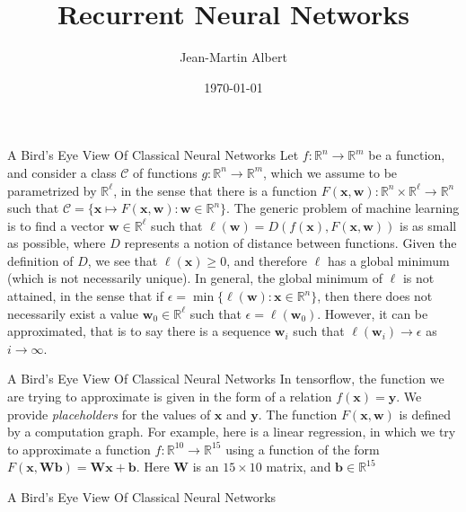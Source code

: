 \documentclass[10pt]{beamer}
\newcommand{\R}{\mathbb{R}}
\newcommand{\C}{\mathcal{C}}
\newcommand{\w}{\mathbf{w}}
\newcommand{\x}{\mathbf{x}}
\newcommand{\y}{\mathbf{y}}
\renewcommand{\b}{\mathbf{b}}
\newcommand{\W}{\mathbf{W}}
\begin{document}
\title{Recurrent Neural Networks}
\author{Jean-Martin Albert}
\date{\today}
\maketitle





\begin{frame}{A Bird's Eye View Of Classical Neural Networks}
Let $f:\R^n\to \R^m$ be a function, and consider a class $\C$ of functions $g: \R^n\to \R^m$, which we assume to be parametrized by $\R^\ell$, in the sense that there is a function $F(\x,\w):\R^n\times \R^\ell\to\R^n$ such that $\C=\{\x\mapsto F(\x,\w):\w\in\R^n\}$.  The generic problem of machine learning is to find a vector $\w\in\R^{\ell}$ such that $\ell(\w) = D(f(\x), F(\x, \w))$ is as small as possible, where $D$ represents a notion of distance between functions.
 Given the definition of $D$, we see that $\ell(\x)\geq 0$, and therefore $\ell$ has a global minimum (which is not necessarily unique). In general, the global minimum of $\ell$ is not attained, in the sense that if $\epsilon=\min\{\ell(\w):\x\in\R^n\}$, then there does not necessarily exist a value $\w_0\in\R^\ell$ such that $\epsilon=\ell(\w_0)$.  However, it can be approximated, that is to say there is a sequence $\w_i$ such that $\ell(\w_i)\to\epsilon$ as $i\to\infty$.
\end{frame}

\begin{frame}{A Bird's Eye View Of Classical Neural Networks}
In tensorflow, the function we are trying to approximate is given in the form of a relation $f(\x)=\y$. We provide {\em placeholders} for the values of $\x$ and $\y$.  The function $F(\x,\w)$ is defined by a computation graph.  For example, here is a linear regression, in which we try to approximate a function $f:\R^{10}\to\R^{15}$ using a function of the form $F(\x, \W\b)=\W\x+\b$. Here $\W$ is an $15\times 10$ matrix, and $\b\in\R^{15}$
\end{frame}

\begin{frame}{A Bird's Eye View Of Classical Neural Networks}
\lstI
\end{frame}
\end{document}
